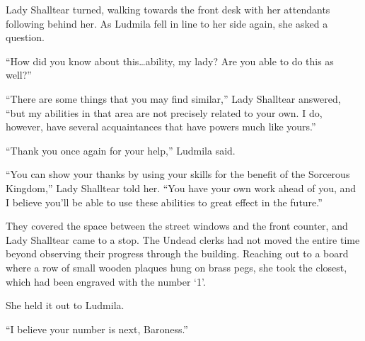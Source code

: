  

Lady Shalltear turned, walking towards the front desk with her attendants following behind her. As Ludmila fell in line to her side again, she asked a question.

 

“How did you know about this…ability, my lady? Are you able to do this as well?”

 

“There are some things that you may find similar,” Lady Shalltear answered, “but my abilities in that area are not precisely related to your own. I do, however, have several acquaintances that have powers much like yours.”

 

“Thank you once again for your help,” Ludmila said.

 

“You can show your thanks by using your skills for the benefit of the Sorcerous Kingdom,” Lady Shalltear told her. “You have your own work ahead of you, and I believe you’ll be able to use these abilities to great effect in the future.”

 

They covered the space between the street windows and the front counter, and Lady Shalltear came to a stop. The Undead clerks had not moved the entire time beyond observing their progress through the building. Reaching out to a board where a row of small wooden plaques hung on brass pegs, she took the closest, which had been engraved with the number ‘1’.

 

She held it out to Ludmila.

 

“I believe your number is next, Baroness.”